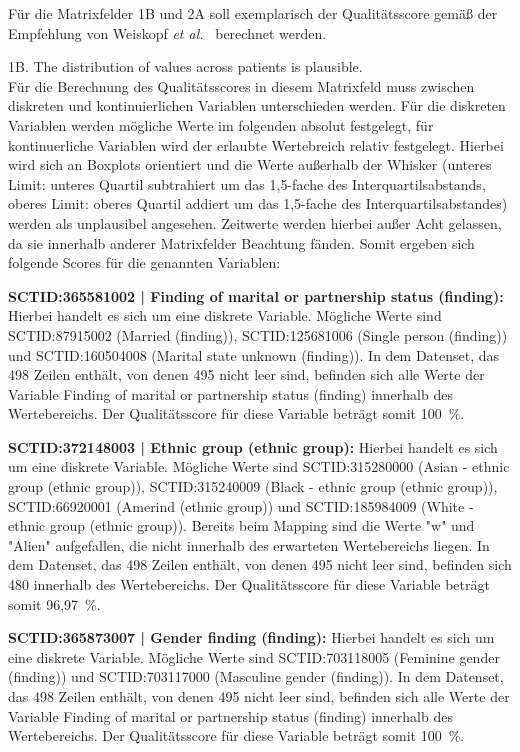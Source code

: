 \documentclass[12pt,a4paper,toc=bibliographynumbered,toc=indenttextentries]{scrreprt}
\begin{document}
		Für die Matrixfelder 1B und 2A soll exemplarisch der Qualitätsscore gemäß der Empfehlung von Weiskopf \textit{et al.}~\cite{10.5334/egems.218} berechnet werden.
		\begin{description}
			\item 1B. The distribution of values across patients is plausible.\\
			Für die Berechnung des Qualitätsscores in diesem Matrixfeld muss zwischen diskreten und kontinuierlichen Variablen unterschieden werden. Für die diskreten Variablen werden mögliche Werte im folgenden absolut festgelegt, für kontinuerliche Variablen wird der erlaubte Wertebreich relativ festgelegt. Hierbei wird sich an Boxplots orientiert und die Werte außerhalb der Whisker (unteres Limit: unteres Quartil subtrahiert um das 1,5-fache des Interquartilsabstands, oberes Limit: oberes Quartil addiert um das 1,5-fache des Interquartilsabstandes) werden als unplausibel angesehen.
			Zeitwerte werden hierbei außer Acht gelassen, da sie innerhalb anderer Matrixfelder Beachtung fänden.
			Somit ergeben sich folgende Scores für die genannten Variablen:\par			
			\textbf{SCTID:365581002 | Finding of marital or partnership status (finding):} Hierbei handelt es sich um eine diskrete Variable. Mögliche Werte sind SCTID:87915002 (Married (finding)), SCTID:125681006 (Single person (finding)) und SCTID:160504008 (Marital state unknown (finding)).
			In dem Datenset, das 498 Zeilen enthält, von denen 495 nicht leer sind, befinden sich alle Werte der Variable Finding of marital or partnership status (finding) innerhalb des Wertebereichs. Der Qualitätsscore für diese Variable beträgt somit 100~\%.\par
			\textbf{SCTID:372148003 | Ethnic group (ethnic group):} Hierbei handelt es sich um eine diskrete Variable. Mögliche Werte sind SCTID:315280000 (Asian - ethnic group (ethnic group)), SCTID:315240009 (Black - ethnic group (ethnic group)), SCTID:66920001 (Amerind (ethnic group)) und SCTID:185984009 (White - ethnic group (ethnic group)).
			Bereits beim Mapping sind die Werte "w" und "Alien" aufgefallen, die nicht innerhalb des erwarteten Wertebereichs liegen.
			In dem Datenset, das 498 Zeilen enthält, von denen 495 nicht leer sind, befinden sich 480 innerhalb des Wertebereichs. Der Qualitätsscore für diese Variable beträgt somit 96,97~\%.\par
			\textbf{SCTID:365873007 | Gender finding (finding):} Hierbei handelt es sich um eine diskrete Variable. Mögliche Werte sind SCTID:703118005 (Feminine gender (finding)) und SCTID:703117000 (Masculine gender (finding)). In dem Datenset, das 498 Zeilen enthält, von denen 495 nicht leer sind, befinden sich alle Werte der Variable Finding of marital or partnership status (finding) innerhalb des Wertebereichs. Der Qualitätsscore für diese Variable beträgt somit 100~\%.\par

\end{description}
\end{document}
